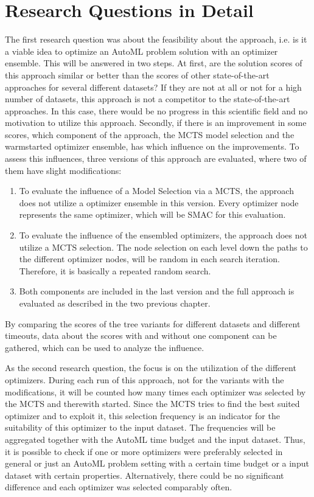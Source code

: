 \section{Research Questions in Detail}
The first research question was about the feasibility about the approach, i.e. is it a viable idea to optimize an AutoML problem solution with an optimizer ensemble.
This will be answered in two steps.\newline
At first, are the solution scores of this approach similar or better than the scores of other state-of-the-art approaches for several different datasets?
If they are not at all or not for a high number of datasets, this approach is not a competitor to the state-of-the-art approaches.
In this case, there would be no progress in this scientific field and no motivation to utilize this approach.\newline
Secondly, if there is an improvement in some scores, which component of the approach, the MCTS model selection and the warmstarted optimizer ensemble, has which influence on the improvements.
To assess this influences, three versions of this approach are evaluated, where two of them have slight modifications:
\begin{enumerate}
    \item To evaluate the influence of a Model Selection via a MCTS, the approach does not utilize a optimizer ensemble in this version.
    Every optimizer node represents the same optimizer, which will be SMAC for this evaluation.
    \item To evaluate the influence of the ensembled optimizers, the approach does not utilize a MCTS selection.
    The node selection on each level down the paths to the different optimizer nodes, will be random in each search iteration.
    Therefore, it is basically a repeated random search.
    \item Both components are included in the last version and the full approach is evaluated as described in the two previous chapter. 
\end{enumerate}
By comparing the scores of the tree variants for different datasets and different timeouts, data about the scores with and without one component can be gathered, which can be used to analyze the influence.

As the second research question, the focus is on the utilization of the different optimizers.
During each run of this approach, not for the variants with the modifications, it will be counted how many times each optimizer was selected by the MCTS and therewith started.
Since the MCTS tries to find the best suited optimizer and to exploit it, this selection frequency is an indicator for the suitability of this optimizer to the input dataset.\newline
The frequencies will be aggregated together with the AutoML time budget and the input dataset.
Thus, it is possible to check if one or more optimizers were preferably selected in general or just an AutoML problem setting with a certain time budget or a input dataset with certain properties.
Alternatively, there could be no significant difference and each optimizer was selected comparably often.

